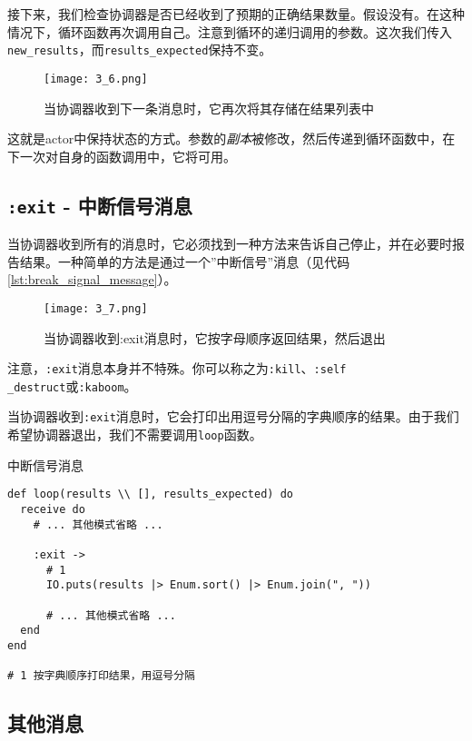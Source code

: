 接下来，我们检查协调器是否已经收到了预期的正确结果数量。假设没有。在这种情况下，循环函数再次调用自己。注意到循环的递归调用的参数。这次我们传入\texttt{new\_results}，而\texttt{results\_expected}保持不变。

\begin{figure}[!ht]
    \centering
    \texttt{[image: 3\_6.png]}
    \caption{当协调器收到下一条消息时，它再次将其存储在结果列表中}
    \label{fig:3_6}
\end{figure}

这就是actor中保持状态的方式。参数的\emph{副本}被修改，然后传递到循环函数中，在下一次对自身的函数调用中，它将可用。


\subsection{\texttt{:exit} - 中断信号消息}

当协调器收到所有的消息时，它必须找到一种方法来告诉自己停止，并在必要时报告结果。一种简单的方法是通过一个''中断信号''消息（见代码\ref{lst:break_signal_message}）。

\begin{figure}[!ht]
    \centering
    \texttt{[image: 3\_7.png]}
    \caption{当协调器收到:exit消息时，它按字母顺序返回结果，然后退出}
    \label{fig:3_7}
\end{figure}

注意，\texttt{:exit}消息本身并不特殊。你可以称之为\texttt{:kill}、\texttt{:self\\\_destruct}或\texttt{:kaboom}。

当协调器收到\texttt{:exit}消息时，它会打印出用逗号分隔的字典顺序的结果。由于我们希望协调器退出，我们不需要调用\texttt{loop}函数。

\begin{code}{中断信号消息}
\begin{verbatim}
def loop(results \\ [], results_expected) do
  receive do
    # ... 其他模式省略 ...

    :exit ->
      # 1
      IO.puts(results |> Enum.sort() |> Enum.join(", "))

      # ... 其他模式省略 ...
  end
end

# 1 按字典顺序打印结果，用逗号分隔
\end{verbatim}
\label{lst:break_signal_message}
\end{code}

\subsection{其他消息}

